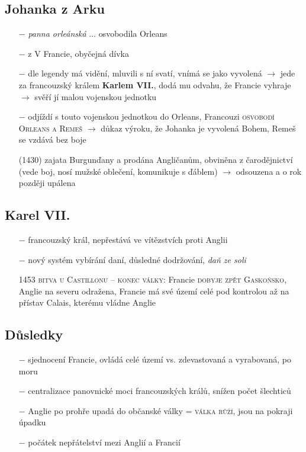 \documentclass{article}
\begin{document}
\subsection*{Johanka z Arku}
\begin{itemize}
    \vspace{-0.5em}
    \setlength\itemsep{0.15em}
    \item[$-$] \textit{panna orleánská} $\dots$ osvobodila Orleans
    \item[$-$] z V Francie, obyčejná dívka
    \item[$-$] dle legendy má vidění, mluvili s ní svatí, vnímá se jako vyvolená $\rightarrow$ jede za francouzský králem \textbf{Karlem VII.}, dodá mu odvahu, že Francie vyhraje $\rightarrow$ svěří jí malou vojenskou jednotku
    \item[$-$] odjíždí s touto vojenskou jednotkou do Orleans, Francouzi \textsc{osvobodí Orleans a Remeš} $\rightarrow$ důkaz výroku, že Johanka je vyvolená Bohem, Remeš se vzdává bez boje
    \item[(1430)] zajata Burgunďany a prodána Angličanům, obviněna z čarodějnictví (vede boj, nosí mužské oblečení, komunikuje s ďáblem) $\rightarrow$ odsouzena a o rok později upálena
\end{itemize}

\subsection*{Karel VII.}
\begin{itemize}
    \vspace{-0.5em}
    \setlength\itemsep{0.15em}
    \item[$-$] francouzský král, nepřestává ve vítězstvích proti Anglii
    \item[$-$] nový systém vybírání daní, důsledné dodržování, \textit{daň ze soli}
    \item[1453] \textsc{bitva u Castillonu} -- \textsc{konec války}: Francie \textsc{dobyje zpět Gaskoňsko}, Anglie na severu odražena, Francie má své území celé pod kontrolou až na přístav Calais, kterému vládne Anglie
\end{itemize}

\subsection*{Důsledky}
\begin{itemize}
    \vspace{-0.5em}
    \setlength\itemsep{0.15em}
    \item[$-$] sjednocení Francie, ovládá celé území vs. zdevastovaná a vyrabovaná, po moru
    \item[$-$] centralizace panovnické moci francouzských králů, snížen počet šlechticů
    \item[$-$] Anglie po prohře upadá do občanské války = \textsc{válka růží}, jsou na pokraji úpadku
    \item[$-$] počátek nepřátelství mezi Anglií a Francií
\end{itemize}
\end{document}
